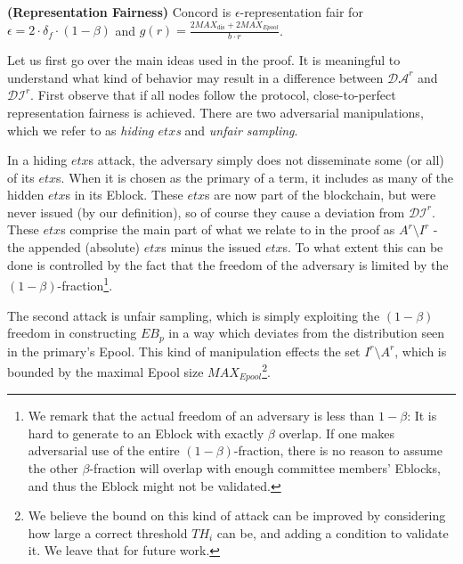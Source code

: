 \begin{theorem}{\textbf{(Representation Fairness)}} Concord is $\epsilon$-representation fair for $\epsilon =2\cdot \delta_f\cdot (1-\beta)$ and $g(r)=\frac{2MAX_\text{dis}+2MAX_{Epool}}{b\cdot r}$.
\end{theorem}

Let us first go over the main ideas used in the proof. It is meaningful to understand what kind of behavior may result in a difference between $\mathcal{DA}^r$ and $\mathcal{DI}^r$. First observe that if all nodes follow the protocol, close-to-perfect representation fairness is achieved. 
There are two adversarial manipulations, which we refer to as \emph{hiding $etx$s} and \emph{unfair sampling}.

In a hiding $etx$s attack, the adversary simply does not disseminate some (or all) of its $etx$s. When it is chosen as the primary of a term, it includes as many of the hidden $etx$s in its Eblock. These $etx$s are now part of the blockchain, but were never issued (by our definition), so of course they cause a deviation from $\mathcal{DI}^r$. These $etx$s comprise the main part of what we relate to in the proof as $A^r\setminus I^r$ - the appended (absolute) $etx$s minus the issued $etx$s. To what extent this can be done is controlled by the fact that the freedom of the adversary is limited by the $(1-\beta)$-fraction\footnote{We remark that the actual freedom of an adversary is less than $1-\beta$: It is hard to generate to an Eblock with exactly $\beta$ overlap. If one makes adversarial use of the entire $(1-\beta)$-fraction, there is no reason to assume the other $\beta$-fraction will overlap with enough committee members' Eblocks, and thus the Eblock might not be validated.}. 

The second attack is unfair sampling, which is simply exploiting the $(1-\beta)$ freedom in constructing $EB_p$ in a way which deviates from the distribution seen in the primary's Epool. This kind of manipulation effects the set $I^r\setminus A^r$, which is bounded by the maximal Epool size $MAX_{Epool}$\footnote{We believe the bound on this kind of attack can be improved by considering how large a correct threshold $TH_i$ can be, and adding a condition to validate it. We leave that for future work.}.


